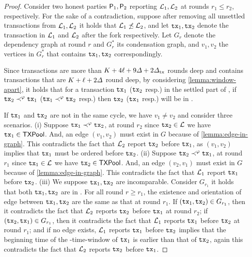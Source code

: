 \begin{proof}
    Consider two honest parties $\mathsf{P}_1, \mathsf{P}_2$ reporting $\mathcal{L}_1, \mathcal{L}_2$ at rounds $r_1 \le r_2$, respectively.
    For the sake of a contradiction, suppose after removing all unsettled transactions from $\mathcal{L}_1, \mathcal{L}_2$ it holds that $\mathcal{L}_1 \not\preceq \mathcal{L}_2$, and let $\mathtt{tx}_1, \mathtt{tx}_2$ denote the transaction in $\mathcal{L}_1$ and $\mathcal{L}_2$ after the fork respectively.
    Let $G_r$ denote the dependency graph at round $r$ and $G^*_r$ its condensation graph, and $v_1, v_2$ the vertices in $G^*_r$ that contains $\mathtt{tx}_1, \mathtt{tx}_2$ correspondingly.

    Since transactions are more than $K + 4\ell + 9\varDelta + 2\varDelta_{\mathrm{tx}}$ rounds deep and \txpool contains transactions that are $K + \ell + 2\varDelta$ round deep, by considering \cref{lemma:window-apart}, it holds that for a transaction $\mathtt{tx}_1$ ($\mathtt{tx}_2$ resp.) in the settled part of \ledger, if $\mathtt{tx}_2 \prec^\varphi \mathtt{tx}_1$ ($\mathtt{tx}_1 \prec^\varphi \mathtt{tx}_2$ resp.) then $\mathtt{tx}_2$ ($\mathtt{tx}_1$ resp.) will be in \txpool.

    If $\mathtt{tx}_1$ and $\mathtt{tx}_2$ are not in the same cycle, we have $v_1 \neq v_2$ and consider three scenarios.
    (i) Suppose $\mathtt{tx}_1 \prec^\varphi \mathtt{tx}_2$, at round $r_2$ since $\mathtt{tx}_2 \in \mathcal{L}$ we have $\mathtt{tx}_1 \in \mathsf{TXPool}$.
    And, an edge $(v_1, v_2)$ must exist in $G$ because of \cref{lemma:edge-in-graph}.
    This contradicts the fact that $\mathcal{L}_2$ report $\mathtt{tx}_2$ before $\mathtt{tx}_1$, as $(v_1, v_2)$ implies that $\mathtt{tx}_1$ must be ordered before $\mathtt{tx}_2$.
    (ii) Suppose $\mathtt{tx}_2 \prec^\varphi \mathtt{tx}_1$, at round $r_1$ since $\mathtt{tx}_1 \in \mathcal{L}$ we have $\mathtt{tx}_2 \in \mathsf{TXPool}$.
    And, an edge $(v_2, v_1)$ must exist in $G$ because of \cref{lemma:edge-in-graph}.
    This contradicts the fact that $\mathcal{L}_1$ report $\mathtt{tx}_1$ before $\mathtt{tx}_2$.
    (iii) We suppose $\mathtt{tx}_1, \mathtt{tx}_2$ are incomparable.
    Consider $G_{r_1}$ it holds that both $\mathtt{tx}_1, \mathtt{tx}_2$ are in \txpool.
    For all round $r \ge r_1$, the existence and orientation of edge between $\mathtt{tx}_1, \mathtt{tx}_2$ are the same as that at round $r_1$.
    If $(\mathtt{tx}_1, \mathtt{tx}_2) \in G_{r_1}$, then it contradicts the fact that $\mathcal{L}_2$ reports $\mathtt{tx}_2$ before $\mathtt{tx}_1$ at round $r_2$;
    if  $(\mathtt{tx}_2, \mathtt{tx}_1) \in G_{r_1}$, then it contradicts the fact that $\mathcal{L}_1$ reports $\mathtt{tx}_1$ before $\mathtt{tx}_2$ at round $r_1$;
    and if no edge exists, $\mathcal{L}_1$ reports $\mathtt{tx}_1$ before $\mathtt{tx}_2$ implies that the beginning time of the \PBWindowLen-time-window of $\mathtt{tx}_1$ is earlier than that of $\mathtt{tx}_2$, again this contradicts the fact that $\mathcal{L}_2$ reports $\mathtt{tx}_2$ before $\mathtt{tx}_1$.


\end{proof}
